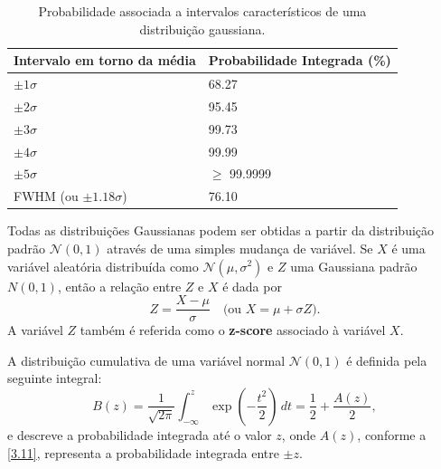 \begin{table}
	\centering
	\begin{tabular}{|l|l|}
		\hline
		Intervalo em torno da média & Probabilidade Integrada (\%) \\ \hline
		$\pm 1\sigma$               & 68.27                        \\ \hline
		$\pm 2\sigma$               & 95.45                        \\ \hline
		$\pm 3\sigma$               & 99.73                        \\ \hline
		$\pm 4\sigma$               & 99.99                        \\ \hline
		$\pm 5\sigma$               & $\geq$ 99.9999               \\ \hline
		FWHM (ou $\pm 1.18 \sigma$) & 76.10                        \\ \hline
	\end{tabular}
	\caption{Probabilidade associada a intervalos característicos de uma distribuição gaussiana.}
	\label{tab:3-2}
\end{table}

Todas as distribuições Gaussianas podem ser obtidas a partir da distribuição padrão $\mathcal{N}(0, 1)$ através de uma simples mudança de variável. Se $X$ é uma variável aleatória distribuída como $\mathcal{N}(\mu, \sigma^2)$ e $Z$ uma Gaussiana padrão $N(0, 1)$, então a relação entre $Z$ e $X$ é dada por
\begin{equation}
Z = \dfrac{X - \mu}{\sigma} \quad \text{(ou } X = \mu + \sigma Z \text{)}.
\end{equation}
A variável $Z$ também é referida como o \textbf{z-score} associado à variável $X$.

A distribuição cumulativa de uma variável normal $\mathcal{N}(0, 1)$ é definida pela seguinte integral:
\begin{equation}
	 B(z) = \dfrac{1}{\sqrt{2\pi}} \int_{-\infty}^{z} \exp\left(-\frac{t^2}{2}\right)\,dt = \dfrac{1}{2} + \dfrac{A(z)}{2},
\end{equation}
e descreve a probabilidade integrada até o valor $z$, onde $A(z)$, conforme a \autoref{3.11}, representa a probabilidade integrada entre $\pm z$.

